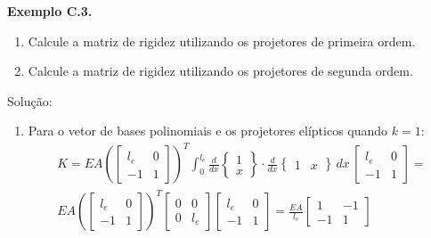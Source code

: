 \vspace{5mm}
\noindent
    \begin{tcolorbox}[breakable, colback=white, colframe=black, boxrule=0.4pt, arc=0pt, outer arc=0pt]
        \vspace{2mm} %
        \textbf{Exemplo C.3.} 
        
        \begin{enumerate}[label=\alph*), leftmargin=*]
            \item Calcule a matriz de rigidez utilizando os projetores de primeira ordem.
            \item Calcule a matriz de rigidez utilizando os projetores de segunda ordem.
        \end{enumerate}
        
        \hrulefill

        Solução: 
        \vspace{2mm}

        \begin{enumerate}[label=\alph*), leftmargin=*]
            \item Para o vetor de bases polinomiais e os projetores elípticos quando $k=1$:
            $$\begin{aligned}
                K = EA \left(\begin{bmatrix} l_e  & 0 \\ -1 & 1 \end{bmatrix}\right)^T \int_{0}^{l_e} \frac{d}{dx}\begin{Bmatrix} 1 \\ x \end{Bmatrix} \cdot \frac{d}{dx}\begin{Bmatrix} 1 & x \end{Bmatrix} \, dx \, \begin{bmatrix} l_e  & 0 \\ -1 & 1 \end{bmatrix} = \\
                EA \left(\begin{bmatrix} l_e  & 0 \\ -1 & 1 \end{bmatrix}\right)^T \begin{bmatrix} 0  & 0 \\ 0 & l_e \end{bmatrix}  \begin{bmatrix} l_e  & 0 \\ -1 & 1 \end{bmatrix} = \frac{EA}{l_e} \begin{bmatrix} 1 & -1 \\ -1 & 1 \end{bmatrix}
            \end{aligned}$$
            

\end{enumerate}
\end{tcolorbox}
